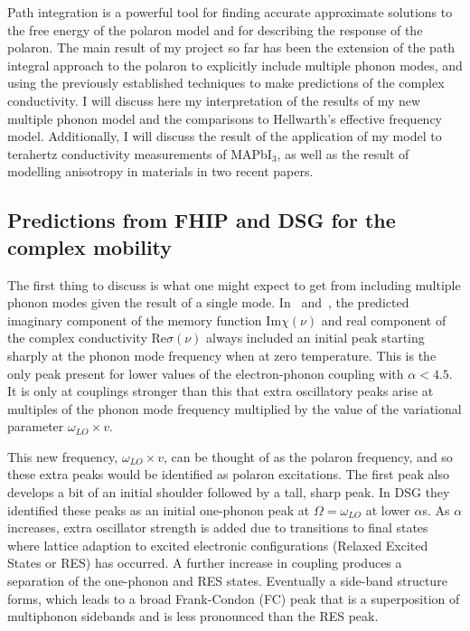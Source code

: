 Path integration is a powerful tool for finding accurate approximate solutions to the free energy of the polaron model and for describing the response of the polaron. The main result of my project so far has been the extension of the path integral approach to the polaron to explicitly include multiple phonon modes, and using the previously established techniques to make predictions of the complex conductivity. I will discuss here my interpretation of the results of my new multiple phonon model and the comparisons to Hellwarth's effective frequency model. Additionally, I will discuss the result of the application of my model to terahertz conductivity measurements of MAPbI$_3$, as well as the result of modelling anisotropy in materials in two recent papers. 

\subsection{Predictions from FHIP and DSG for the complex mobility}

The first thing to discuss is what one might expect to get from including multiple phonon modes given the result of a single mode. In~\cite{feynman_mobility_1962} and~\cite{devreese_optical_1972}, the predicted imaginary component of the memory function $\text{Im}\chi(\nu)$ and real component of the complex conductivity $\text{Re}\sigma(\nu)$ always included an initial peak starting sharply at the phonon mode frequency when at zero temperature. This is the only peak present for lower values of the electron-phonon coupling with $\alpha < 4.5$. It is only at couplings stronger than this that extra oscillatory peaks arise at multiples of the phonon mode frequency multiplied by the value of the variational parameter $\omega_{LO} \times v$. 

This new frequency, $\omega_{LO} \times v$, can be thought of as the polaron frequency, and so these extra peaks would be identified as polaron excitations. The first peak also develops a bit of an initial shoulder followed by a tall, sharp peak. In DSG they identified these peaks as an initial one-phonon peak at $\Omega = \omega_{LO}$ at lower $\alpha$s. As $\alpha$ increases, extra oscillator strength is added due to transitions to final states where lattice adaption to excited electronic configurations (Relaxed Excited States or RES) has occurred. A further increase in coupling produces a separation of the one-phonon and RES states. Eventually a side-band structure forms, which leads to a broad Frank-Condon (FC) peak that is a superposition of multiphonon sidebands and is less pronounced than the RES peak. 

